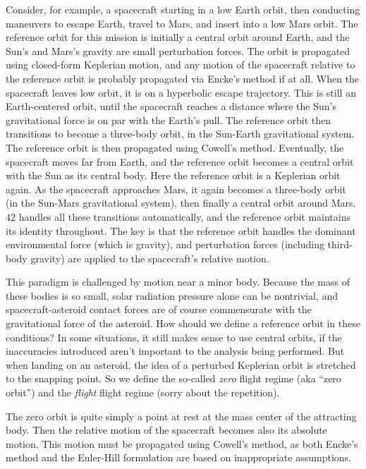 \documentclass[12pt]{article}
\begin{document}
Consider, for example, a spacecraft starting in a low Earth orbit, then conducting maneuvers to escape Earth, travel to Mars, and insert into a low Mars orbit.  The reference orbit for this mission is initially a central orbit around Earth, and the Sun's and Mars's gravity are small perturbation forces.  The orbit is propagated using closed-form Keplerian motion, and any motion of the spacecraft relative to the reference orbit is probably propagated via Encke's method if at all.  When the spacecraft leaves low orbit, it is on a hyperbolic escape trajectory.  This is still an Earth-centered orbit, until the spacecraft reaches a distance where the Sun's gravitational force is on par with the Earth's pull.  The reference orbit then transitions to become a three-body orbit, in the Sun-Earth gravitational system.  The reference orbit is then propagated using Cowell's method.  Eventually, the spacecraft moves far from Earth, and the reference orbit becomes a central orbit with the Sun as its central body.  Here the reference orbit is a Keplerian orbit again.  As the spacecraft approaches Mars, it again becomes a three-body orbit (in the Sun-Mars gravitational system), then finally a central orbit around Mars.  42 handles all these transitions automatically, and the reference orbit maintains its identity throughout.  The key is that the reference orbit handles the dominant environmental force (which is gravity), and perturbation forces (including third-body gravity) are applied to the spacecraft's relative motion.

This paradigm is challenged by motion near a minor body.  Because the mass of these bodies is so small, solar radiation pressure alone can be nontrivial, and spacecraft-asteroid contact forces are of course commensurate with the gravitational force of the asteroid.  How should we define a reference orbit in these conditions?  In some situations, it still makes sense to use central orbits, if the inaccuracies introduced aren't important to the analysis being performed.  But when landing on an asteroid, the idea of a perturbed Keplerian orbit is stretched to the snapping point.  So we define the so-called {\em zero} flight regime (aka ``zero orbit'') and the {\em flight} flight regime (sorry about the repetition).  

The zero orbit is quite simply a point at rest at the mass center of the attracting body.  Then the relative motion of the spacecraft becomes also its absolute motion.  This motion must be propagated using Cowell's method, as both Encke's method and the Euler-Hill formulation are based on inappropriate assumptions.
\end{document}

